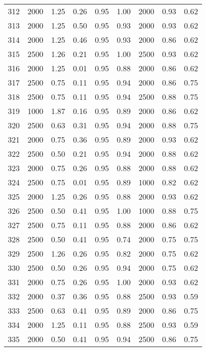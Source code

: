 \begin{longtable}[c]{ccccccccc}
312 &  2000 &  1.25 &  0.26 &  0.95 &  1.00 &  2000 &  0.93 &  0.62 \\
313 &  2000 &  1.25 &  0.50 &  0.95 &  0.93 &  2000 &  0.93 &  0.62 \\
314 &  2000 &  1.25 &  0.46 &  0.95 &  0.93 &  2000 &  0.86 &  0.62 \\
315 &  2500 &  1.26 &  0.21 &  0.95 &  1.00 &  2500 &  0.93 &  0.62 \\
316 &  2000 &  1.25 &  0.01 &  0.95 &  0.88 &  2000 &  0.86 &  0.62 \\
317 &  2500 &  0.75 &  0.11 &  0.95 &  0.94 &  2000 &  0.86 &  0.75 \\
318 &  2500 &  0.75 &  0.11 &  0.95 &  0.94 &  2500 &  0.88 &  0.75 \\
319 &  1000 &  1.87 &  0.16 &  0.95 &  0.89 &  2000 &  0.86 &  0.62 \\
320 &  2500 &  0.63 &  0.31 &  0.95 &  0.94 &  2000 &  0.88 &  0.75 \\
321 &  2000 &  0.75 &  0.36 &  0.95 &  0.89 &  2000 &  0.93 &  0.62 \\
322 &  2500 &  0.50 &  0.21 &  0.95 &  0.94 &  2000 &  0.88 &  0.62 \\
323 &  2000 &  0.75 &  0.26 &  0.95 &  0.88 &  2000 &  0.88 &  0.62 \\
324 &  2500 &  0.75 &  0.01 &  0.95 &  0.89 &  1000 &  0.82 &  0.62 \\
325 &  2000 &  1.25 &  0.26 &  0.95 &  0.88 &  2000 &  0.93 &  0.62 \\
326 &  2500 &  0.50 &  0.41 &  0.95 &  1.00 &  1000 &  0.88 &  0.75 \\
327 &  2500 &  0.75 &  0.11 &  0.95 &  0.88 &  2000 &  0.86 &  0.62 \\
328 &  2500 &  0.50 &  0.41 &  0.95 &  0.74 &  2000 &  0.75 &  0.75 \\
329 &  2500 &  1.26 &  0.26 &  0.95 &  0.82 &  2000 &  0.75 &  0.62 \\
330 &  2500 &  0.50 &  0.26 &  0.95 &  0.94 &  2000 &  0.75 &  0.62 \\
331 &  2000 &  0.75 &  0.26 &  0.95 &  1.00 &  2000 &  0.93 &  0.62 \\
332 &  2000 &  0.37 &  0.36 &  0.95 &  0.88 &  2500 &  0.93 &  0.59 \\
333 &  2500 &  0.63 &  0.41 &  0.95 &  0.89 &  2000 &  0.86 &  0.75 \\
334 &  2000 &  1.25 &  0.11 &  0.95 &  0.88 &  2500 &  0.93 &  0.59 \\
335 &  2000 &  0.50 &  0.41 &  0.95 &  0.94 &  2500 &  0.86 &  0.75 \\

\end{longtable}
